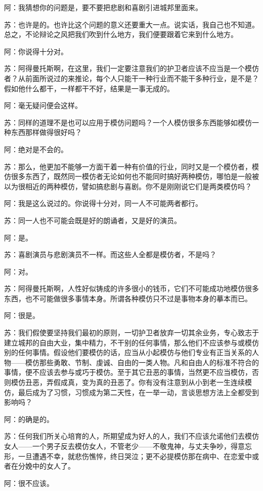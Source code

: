 \documentclass[11pt,oneside]{book}
\begin{document}
\begin{common-format}
阿：我猜想你的问题是，要不要把悲剧和喜剧引进城邦里面来。

苏：也许是的。也许比这个问题的意义还要重大一点。说实话，我自己也不知道。总之，不论辩论之风把我们吹到什么地方，我们便要跟着它来到什么地方。

阿：你说得十分对。

苏：阿得曼托斯啊，在这里，我们一定要注意我们的护卫者应该不应当是一个模仿者？从前面所说过的来推论，每个人只能干一种行业而不能干多种行业，是不是？假如他什么都干，一样都干不好，结果是一事无成的。

阿：毫无疑问便会这样。

苏：同样的道理不是也可以应用于模仿问题吗？一个人模仿很多东西能够如模仿一种东西那样做得很好吗？

阿：绝对是不会的。

苏：那么，他更加不能够一方面干着一种有价值的行业，同时又是一个模仿者，模仿很多东西了，既然同一模仿者无论如何也不能同时搞好两种模仿，哪怕是一般被以为很相近的两种模仿，譬如搞悲剧与喜剧。你不是刚刚说它们是两类模仿吗？

阿：我是这么说过的。你说得十分对，同一人不可能两者都行。

苏：同一人也不可能会既是好的朗诵者，又是好的演员。

阿：是。

苏：喜剧演员与悲剧演员不一样。而这些人全都是模仿者，不是吗？

阿：对。

苏：阿得曼托斯啊，人性好似铸成的许多很小的钱币，它们不可能成功地模仿很多东西，也不可能做很多事情本身。所谓各种模仿只不过是事物本身的摹本而已。

阿：很是。

苏：我们假使要坚持我们最初的原则，一切护卫者放弃一切其余业务，专心致志于建立城邦的自由大业，集中精力，不干别的任何事情，那么他们不应该参与或模仿别的任何事情。假设他们要模仿的话，应当从小起模仿与他们专业有正当关系的人物——模仿那些勇敢、节制、虔诚、自由的一类人物。凡和自由人的标准不符合的事情，便不应该去参与或巧于模仿。至于其它丑恶的事情，当然更不应当模仿，否则模仿丑恶，弄假成真，变为真的丑恶了。你有没有注意到从小到老一生连续模仿，最后成为了习惯，习惯成为第二天性，在一举一动，言谈思想方法上全都受到影响吗？

阿：的确是的。

苏：任何我们所关心培育的人，所期望成为好人的人，我们不应该允诺他们去模仿女人——一个男子反去模仿女人，不管老少——不敬鬼神，与丈夫争吵，得意忘形，一旦遭遇不幸，就悲伤憔悴，终日哭泣；更不必提模仿那在病中、在恋爱中或者在分娩中的女人了。

阿：很不应该。


\end{common-format}
\end{document}
